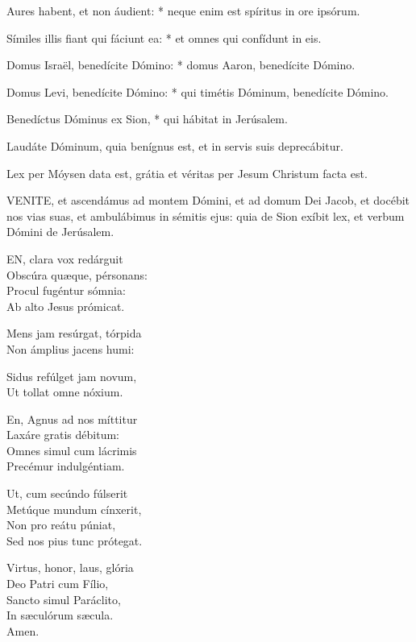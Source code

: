 Aures habent, et non áudient: * neque enim est spíritus in ore ipsórum.

Símiles illis fiant qui fáciunt ea: * et omnes qui confídunt in eis.

Domus Israël, benedícite Dómino: * domus Aaron, benedícite Dómino.

Domus Levi, benedícite Dómino: * qui timétis Dóminum, benedícite Dómino.

Benedíctus Dóminus ex Sion, * qui hábitat in Jerúsalem.

 Laudáte Dóminum, quia benígnus est, et in servis suis deprecábitur.

  Lex per Móysen data est, grátia et véritas per Jesum Christum facta est.



\lettrine[lines=2]{V}{ENITE}, et ascendámus ad montem Dómini, et ad domum Dei Jacob, et docébit nos vias suas, et ambulábimus in sémitis ejus: quia de Sion exíbit lex, et verbum Dómini de Jerúsalem.


\lettrine[lines=2]{E}{N}, clara vox redárguit\\
Obscúra quæque, pérsonans:\\
Procul fugéntur sómnia:\\
Ab alto Jesus prómicat.

Mens jam resúrgat, tórpida\\
Non ámplius jacens humi:

Sidus refúlget jam novum,\\
Ut tollat omne nóxium.

En, Agnus ad nos míttitur\\
Laxáre gratis débitum:\\
Omnes simul cum lácrimis\\
Precémur indulgéntiam.

Ut, cum secúndo fúlserit\\
Metúque mundum cínxerit,\\
Non pro reátu púniat,\\
Sed nos pius tunc prótegat.

Virtus, honor, laus, glória\\
Deo Patri cum Fílio,\\
Sancto simul Paráclito,\\
In sæculórum sæcula.\\
Amen.

